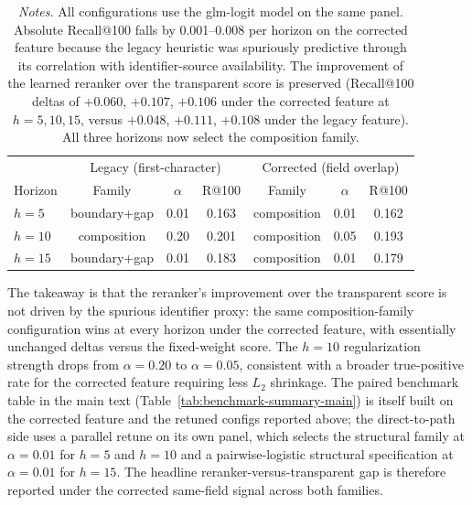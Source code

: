 \documentclass[11pt]{article}
\newcommand{\fignotes}[1]{\caption*{\textit{Notes.} #1}}
\begin{document}
\begin{table}[h]
  \caption{Best-config comparison: legacy first-character heuristic vs corrected field overlap}
  \label{tab:field-overlap-retune}
  \centering
  \small
  \begin{tabular}{lcccccc}
    \toprule
    & \multicolumn{3}{c}{Legacy (first-character)} & \multicolumn{3}{c}{Corrected (field overlap)} \\
    Horizon & Family & $\alpha$ & R@100 & Family & $\alpha$ & R@100 \\
    \midrule
    $h=5$  & boundary+gap & 0.01 & 0.163 & composition & 0.01 & 0.162 \\
    $h=10$ & composition  & 0.20 & 0.201 & composition & 0.05 & 0.193 \\
    $h=15$ & boundary+gap & 0.01 & 0.183 & composition & 0.01 & 0.179 \\
    \bottomrule
  \end{tabular}
  \fignotes{All configurations use the glm-logit model on the same panel. Absolute Recall@100 falls by 0.001--0.008 per horizon on the corrected feature because the legacy heuristic was spuriously predictive through its correlation with identifier-source availability. The improvement of the learned reranker over the transparent score is preserved (Recall@100 deltas of $+0.060$, $+0.107$, $+0.106$ under the corrected feature at $h=5, 10, 15$, versus $+0.048$, $+0.111$, $+0.108$ under the legacy feature). All three horizons now select the composition family.}
\end{table}

The takeaway is that the reranker's improvement over the transparent score is not driven by the spurious identifier proxy: the same composition-family configuration wins at every horizon under the corrected feature, with essentially unchanged deltas versus the fixed-weight score. The $h=10$ regularization strength drops from $\alpha = 0.20$ to $\alpha = 0.05$, consistent with a broader true-positive rate for the corrected feature requiring less $L_2$ shrinkage. The paired benchmark table in the main text (Table~\ref{tab:benchmark-summary-main}) is itself built on the corrected feature and the retuned configs reported above; the direct-to-path side uses a parallel retune on its own panel, which selects the structural family at $\alpha=0.01$ for $h=5$ and $h=10$ and a pairwise-logistic structural specification at $\alpha=0.01$ for $h=15$. The headline reranker-versus-transparent gap is therefore reported under the corrected same-field signal across both families.
\end{document}
